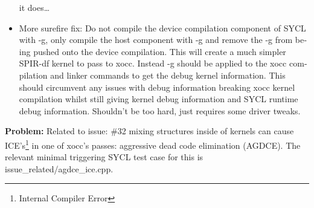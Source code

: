 \begin{otherlanguage}{english}
\begin{itemize}
                                                   it does\ldots
                                             \item More surefire fix: Do not
                                                   compile the device
                                                   compilation component of SYCL
                                                   with -g, only compile the
                                                   host component with -g and
                                                   remove the -g from being
                                                   pushed onto the device
                                                   compilation. This will create
                                                   a much simpler SPIR-df kernel
                                                   to pass to xocc. Instead -g
                                                   should be applied to the
                                                   xocc compilation and linker
                                                   commands to get the debug
                                                   kernel information. This
                                                   should circumvent any issues
                                                   with debug information
                                                   breaking xocc kernel
                                                   compilation whilst still
                                                   giving kernel debug
                                                   information and SYCL runtime
                                                   debug information. Shouldn't
                                                   be too hard, just requires
                                                   some driver tweaks.
                                         \end{itemize}
                                         \textbf{Problem:} Related to issue:
                                         \#32 mixing structures inside of
                                         kernels can cause ICE's\footnote{
                                         Internal Compiler Error} in one of
                                         xocc's passes: aggressive dead code
                                         elimination (AGDCE). The relevant
                                         minimal triggering SYCL test case for
                                         this is issue\_related/agdce\_ice.cpp.
                                         \\

\end{otherlanguage}

